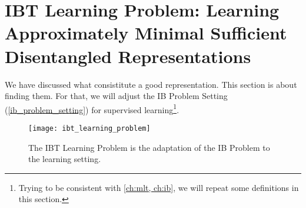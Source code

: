 \section[IBT Learning Problem]{IBT Learning Problem: Learning Approximately Minimal Sufficient Disentangled Representations}\label{sec:ibt_learning_problem}
    We have discussed what consistitute a good representation. This section is about finding them. For that, we will adjust the IB Problem Setting (\cref{ib_problem_setting}) for supervised learning\footnote{Trying to be consistent with \cref{ch:mlt, ch:ib}, we will repeat some definitions in this section.}.
    \begin{figure}
      \centering
         \texttt{[image: ibt\_learning\_problem]}
         \caption{The \ac{IBT} Learning Problem is the adaptation of the IB Problem to the learning setting.}
         \label{fig:ibt_learning_problem}
      \end{figure}

